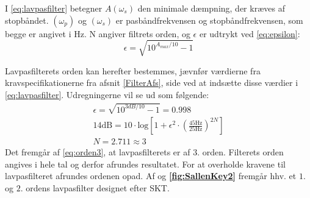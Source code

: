 \noindent I \eqref{eq:lavpasfilter} betegner $A(\omega _s)$ den minimale dæmpning, der kræves af stopbåndet. $(\omega_p)$ og $(\omega_s)$ er pasbåndfrekvensen og stopbåndfrekvensen, som begge er angivet i Hz. N angiver filtrets orden, og $\epsilon$ er udtrykt ved \eqref{eq:epsilon}:
\begin{equation}\label{eq:epsilon}
\epsilon = \sqrt{10^{A_{max} / 10} -1}
\end{equation}

\noindent Lavpasfilterets orden kan herefter bestemmes, jævnfør værdierne fra kravspecifikationerne fra afsnit \ref{FilterAfs}, side \pageref{FilterAfs} ved at indsætte disse værdier i \eqref{eq:lavpasfilter}. Udregningerne vil se ud som følgende:
\begin{eqnarray}\label{eq:orden}
\epsilon = \sqrt{10^{3dB /10} -1} = 0.998 \\ 
14\text{dB} = 10 \cdot \text{log} \left[1 + \epsilon ^2 \cdot (\frac{45\text{Hz}}{25\text{Hz}})^{2N}\right] \\
\label{eq:orden3}N = 2.711 \approx 3
\end{eqnarray}
\noindent Det fremgår af \eqref{eq:orden3}, at lavpasfilterets er af $3$. orden. Filterets orden angives i hele tal og derfor afrundes resultatet. For at overholde kravene til lavpasfilteret afrundes ordenen opad. Af  og \textbf{\ref{fig:SallenKey2}} fremgår hhv. et $1$. og $2$. ordens lavpasfilter designet efter SKT. \cite{Carter2013}
	
